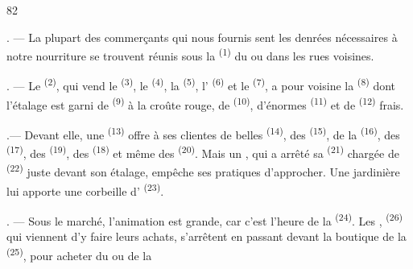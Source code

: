 \begin{VUpage}[84]{82}
\VUsaut{2.0mm}
\VUsaut{2.4mm}

\VUsaut{4.0mm}

. --- La plupart des commerçants qui nous fournis\cc
sent les denrées nécessaires à notre nourriture se\nl
trouvent réunis sous la  \textsuperscript{(1)} du \nl
ou dans les rues voisines.

. --- Le  \textsuperscript{(2)}, qui vend le  \textsuperscript{(3)}, le\nl
{} \textsuperscript{(4)}, la  \textsuperscript{(5)}, l' \textsuperscript{(6)} et le\nl
{}\textsuperscript{(7)}, a pour voisine la \nl
{} \textsuperscript{(8)} dont l'étalage est garni de \cc
{} \textsuperscript{(9)} à la croûte rouge, de\nl
{} \textsuperscript{(10)}, d'énormes  \textsuperscript{(11)}\nl
et de  \textsuperscript{(12)} frais.

.--- Devant elle, une  \textsuperscript{(13)}\nl
offre à ses clientes de belles  \textsuperscript{(14)}, des \cc
{} \textsuperscript{(15)}, de la  \textsuperscript{(16)}, des  \textsuperscript{(17)},\nl
des  \textsuperscript{(19)}, des  \textsuperscript{(18)} et même des\nl
{} \textsuperscript{(20)}. Mais un , qui a\nl
arrêté sa  \textsuperscript{(21)} chargée de \cc
{} \textsuperscript{(22)} juste devant son étalage, empêche\nl
ses pratiques d'approcher. Une jardinière lui apporte\nl
une corbeille d' \textsuperscript{(23)}.

. --- Sous le marché, l'animation est grande, car\nl
c'est l'heure de la  \textsuperscript{(24)}. Les , \textsuperscript{(26)} qui\nl
viennent d'y faire leurs achats, s'arrêtent en passant\nl
devant la boutique de la  \textsuperscript{(25)}, pour acheter du\nl
{} ou de la 


\end{VUpage}

